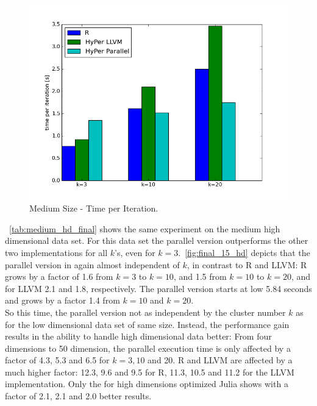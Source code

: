 \begin{figure}[htsb]
  \centering
  \includegraphics[scale=0.4, trim="0cm 1.5cm 0cm 0cm"]{figures/charts/final_15M}
  \caption[Medium Size - Time per Iteration]{Medium Size - Time per Iteration.}
  \label{fig:final_15M}
\end{figure}

~\autoref{tab:medium_hd_final} shows the same experiment on the medium high dimensional data set. For this data set the parallel version outperforms the other two implementations for all $k$'s, even for $k = 3$.~\autoref{fig:final_15_hd} depicts that the parallel version in again almost independent of $k$, in contrast to R and LLVM: R grows by a factor of 1.6 from $k = 3$ to $k = 10$, and 1.5 from $k = 10$ to $k = 20$, and for LLVM 2.1 and 1.8, respectively. The parallel version starts at low 5.84 seconds and grows by a factor 1.4 from $k = 10$ and $k = 20$. 
\\
So this time, the parallel version not as independent by the cluster number $k$ as for the low dimensional data set of same size. Instead, the performance gain results in the ability to handle high dimensional data better: From four dimensions to 50 dimension, the parallel execution time is only affected by a factor of 4.3, 5.3 and 6.5 for $k = 3, 10$ and 20. R and LLVM are affected by a much higher factor: 12.3, 9.6 and 9.5 for R, 11.3, 10.5 and 11.2 for the LLVM implementation. Only the for high dimensions optimized Julia shows with a factor of 2.1, 2.1 and 2.0 better results.

